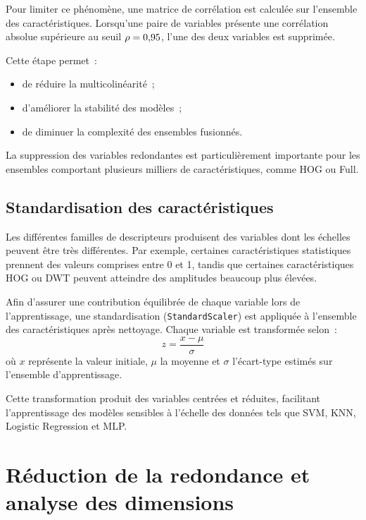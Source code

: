 Pour limiter ce phénomène, une matrice de corrélation est calculée sur l'ensemble des
caractéristiques. Lorsqu'une paire de variables présente une corrélation absolue supérieure
au seuil $\rho = 0{,}95{}$, l'une des deux variables est supprimée.

Cette étape permet~:
\begin{itemize}[leftmargin=1.4em,itemsep=2pt]
  \item de réduire la multicolinéarité~;
  \item d'améliorer la stabilité des modèles~;
  \item de diminuer la complexité des ensembles fusionnés.
\end{itemize}

La suppression des variables redondantes est particulièrement importante pour les ensembles
comportant plusieurs milliers de caractéristiques, comme HOG ou Full.

\subsection{Standardisation des caractéristiques}

Les différentes familles de descripteurs produisent des variables dont les échelles peuvent
être très différentes. Par exemple, certaines caractéristiques statistiques prennent des
valeurs comprises entre 0 et 1, tandis que certaines caractéristiques HOG ou DWT peuvent
atteindre des amplitudes beaucoup plus élevées.

Afin d'assurer une contribution équilibrée de chaque variable lors de l'apprentissage, une
standardisation (\texttt{StandardScaler}) est appliquée à l'ensemble des caractéristiques
après nettoyage. Chaque variable est transformée selon~:
\begin{equation}
  z = \frac{x-\mu}{\sigma}
\end{equation}
où $x$ représente la valeur initiale, $\mu$ la moyenne et $\sigma$ l'écart-type estimés sur
l'ensemble d'apprentissage.

Cette transformation produit des variables centrées et réduites, facilitant l'apprentissage
des modèles sensibles à l'échelle des données tels que SVM, KNN, Logistic Regression et MLP.

\section{Réduction de la redondance et analyse des dimensions}

